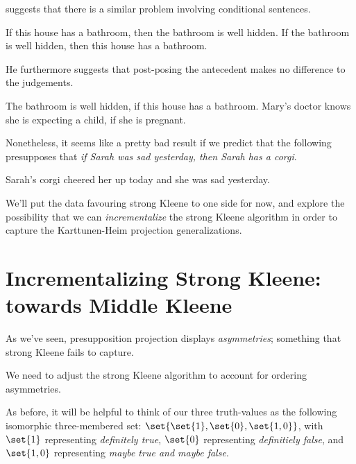 \documentclass[nols,twoside,nofonts,nobib,nohyper]{tufte-handout}
\theoremstyle{definition}
\begin{document}
    \citeauthor{Schlenker2008} suggests that there is a similar problem involving conditional sentences.

    \pex
    \a If this house has a bathroom, then the bathroom is well hidden.
    \a If the bathroom is well hidden, then this house has a bathroom.\\
    \phantom{,}\hfill\citep[p.\,186]{Schlenker2008}
    \xe

    He furthermore suggests that post-posing the antecedent makes no difference to the judgements.

    \pex
    \a The bathroom is well hidden, if this house has a bathroom.
    \a Mary's doctor knows she is expecting a child, if she is pregnant.\\
    \phantom{,}\hfill\citep[p.\,186]{Schlenker2008}
    \xe

    Nonetheless, it seems like a pretty bad result if we predict that the following presupposes that \textit{if Sarah was sad yesterday, then Sarah has a corgi}.

    \ex
    Sarah's corgi cheered her up today and she was sad yesterday.
    \xe

    We'll put the data favouring strong Kleene to one side for now, and explore the possibility that we can \textit{incrementalize} the strong Kleene algorithm in order to capture the Karttunen-Heim projection generalizations.

\section{Incrementalizing Strong Kleene: towards Middle Kleene}

As we've seen, presupposition projection displays \textit{asymmetries}; something that strong Kleene fails to capture.

We need to adjust the strong Kleene algorithm to account for ordering asymmetries.

As before, it will be helpful to think of our three truth-values as the following isomorphic three-membered set: $\set{\set{1},\set{0},\set{1,0}}$, with $\set{1}$ representing \textit{definitely true}, $\set{0}$ representing \textit{definitiely false}, and $\set{1,0}$ representing \textit{maybe true and maybe false}.
\end{document}
